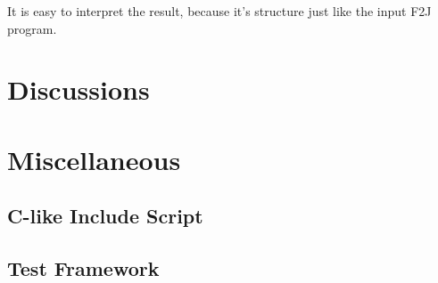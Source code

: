 It is easy to interpret the result, because it's structure just like the input F2J program.

\section{Discussions}

\section{Miscellaneous}
\subsection{C-like Include Script}

\subsection{Test Framework}

